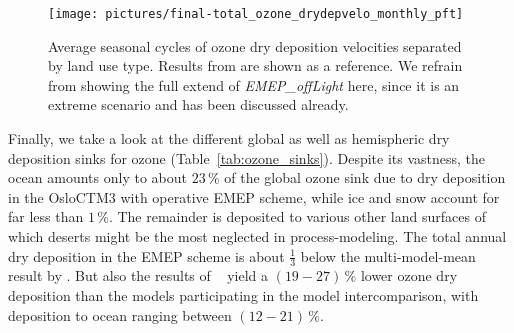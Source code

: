 \documentclass[gmd, manuscript]{copernicus}
\begin{document}
%
\begin{figure*}[t]
  \texttt{[image: pictures/final-total\_ozone\_drydepvelo\_monthly\_pft]}
  \caption{Average seasonal cycles of ozone dry deposition velocities separated by land use type. Results from \citep{ACP:Hardacre2015} are shown as a reference. We refrain from showing the full extend of \emph{EMEP\_offLight} here, since it is an extreme scenario and has been discussed already.}
  \label{fig:mmm_drydep_season_pft}
\end{figure*}
%

Finally, we take a look at the different global as well as hemispheric dry deposition sinks for ozone (Table~\ref{tab:ozone_sinks}). Despite its vastness, the ocean amounts only to about $23\,\unit{\%}$ of the global ozone sink due to dry deposition in the OsloCTM3 with operative EMEP scheme, while ice and snow account for far less than $1\,\unit{\%}$. The remainder is deposited to various other land surfaces of which deserts might be the most neglected in process-modeling. The total annual dry deposition in the EMEP scheme is about $\frac{1}{3}$ below the multi-model-mean result by \citet{ACP:Hardacre2015}. But also the results of ~\citet{ACP:Luhar2017} yield a $(19-27)\,\unit{\%}$ lower ozone dry deposition than the models participating in the model intercomparison, with deposition to ocean ranging between $(12-21)\,\unit{\%}$.
%
\end{document}

